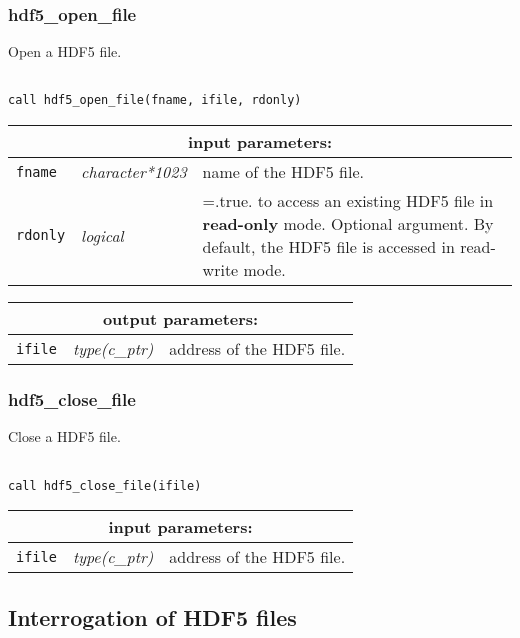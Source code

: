\subsubsection{hdf5\_open\_file}

Open a HDF5 file.
\begin{verbatim}

call hdf5_open_file(fname, ifile, rdonly)
\end{verbatim}

\noindent
\begin{tabular}{|p{1.5cm}|p{3cm}|p{10cm}|}
\hline
\multicolumn{3}{|c|}{\bf input parameters:} \\
\hline
{\tt fname} & {\it character*1023} & name of the HDF5 file. \\
\hline
{\tt rdonly} & {\it logical} & =.true. to access an existing HDF5 file in {\bf read-only} mode. Optional argument.
By default, the HDF5 file is accessed in read-write mode. \\ 
\hline
\end{tabular}

\vskip 0.8cm

\noindent
\begin{tabular}{|p{1.5cm}|p{3cm}|p{10cm}|}
\hline
\multicolumn{3}{|c|}{\bf output parameters:} \\
\hline
{\tt ifile} & {\it type(c\_ptr)} & address of the HDF5 file. \\
\hline
\end{tabular}

\subsubsection{hdf5\_close\_file}

Close a HDF5 file.

\begin{verbatim}

call hdf5_close_file(ifile)
\end{verbatim}

\noindent
\begin{tabular}{|p{1.5cm}|p{3cm}|p{10cm}|}
\hline
\multicolumn{3}{|c|}{\bf input parameters:} \\
\hline
{\tt ifile} & {\it type(c\_ptr)} & address of the HDF5 file. \\
\hline
\end{tabular}

\vskip 0.8cm

\subsection{Interrogation of HDF5 files}

